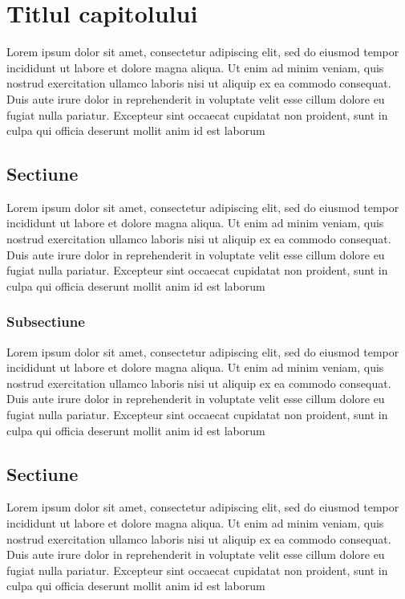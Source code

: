 \chapter{Titlul capitolului}
\label{chap:ch3}

\par Lorem ipsum dolor sit amet, consectetur adipiscing elit, sed do eiusmod tempor
incididunt ut labore et dolore magna aliqua. Ut enim ad minim veniam, quis nostrud
exercitation ullamco laboris nisi ut aliquip ex ea commodo consequat. Duis aute irure
dolor in reprehenderit in voluptate velit esse cillum dolore eu fugiat nulla pariatur.
Excepteur sint occaecat cupidatat non proident, sunt in culpa qui officia deserunt mollit
anim id est laborum

\section{Sectiune}
\label{sec:ch3sec1}

\par Lorem ipsum dolor sit amet, consectetur adipiscing elit, sed do eiusmod tempor
incididunt ut labore et dolore magna aliqua. Ut enim ad minim veniam, quis nostrud
exercitation ullamco laboris nisi ut aliquip ex ea commodo consequat. Duis aute irure
dolor in reprehenderit in voluptate velit esse cillum dolore eu fugiat nulla pariatur.
Excepteur sint occaecat cupidatat non proident, sunt in culpa qui officia deserunt mollit
anim id est laborum

\subsection{Subsectiune}
\label{subsec:ch3sec1subsec1}

\par Lorem ipsum dolor sit amet, consectetur adipiscing elit, sed do eiusmod tempor
incididunt ut labore et dolore magna aliqua. Ut enim ad minim veniam, quis nostrud
exercitation ullamco laboris nisi ut aliquip ex ea commodo consequat. Duis aute irure
dolor in reprehenderit in voluptate velit esse cillum dolore eu fugiat nulla pariatur.
Excepteur sint occaecat cupidatat non proident, sunt in culpa qui officia deserunt mollit
anim id est laborum

\section{Sectiune}
\label{sec:ch3sec2}

\par Lorem ipsum dolor sit amet, consectetur adipiscing elit, sed do eiusmod tempor
incididunt ut labore et dolore magna aliqua. Ut enim ad minim veniam, quis nostrud
exercitation ullamco laboris nisi ut aliquip ex ea commodo consequat. Duis aute irure
dolor in reprehenderit in voluptate velit esse cillum dolore eu fugiat nulla pariatur.
Excepteur sint occaecat cupidatat non proident, sunt in culpa qui officia deserunt mollit
anim id est laborum

